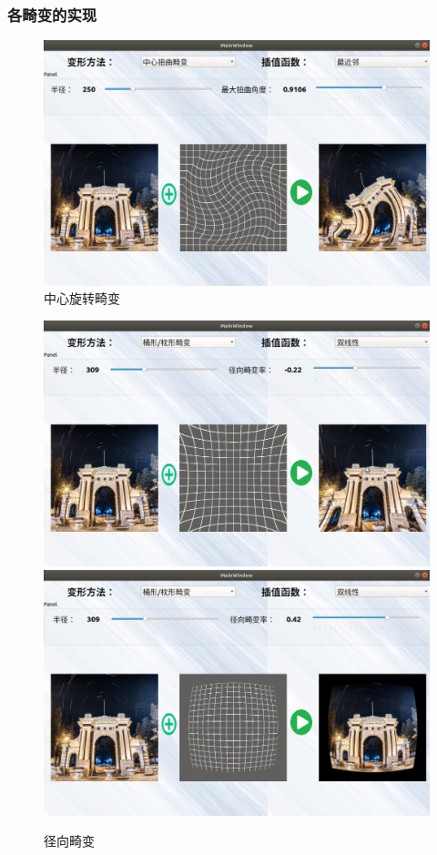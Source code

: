 \documentclass[UTF8]{ctexart}
\begin{document}
\subsubsection{各畸变的实现}
\begin{figure}[H]
    \centering
    \includegraphics[scale=0.3]{../images/report-images/tangent_dis.png}
    \caption{中心旋转畸变}
\end{figure}
\begin{figure}[H]
    \centering
    \includegraphics[scale=0.3]{../images/report-images/ao.png}
    \includegraphics[scale=0.3]{../images/report-images/tu.png}
    \caption{径向畸变}
\end{figure}
\end{document}
